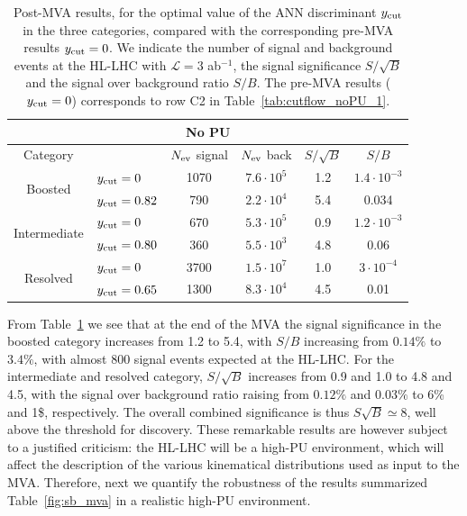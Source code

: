 \begin{table}[t]
  \centering
  \begin{tabular}{|c|l|c|c|c|c|}
    \hline
    \multicolumn{6}{|c|}{No PU} \\
    \hline
    \hline
    Category  &   &  $N_{\rm ev}$ signal &  $N_{\rm ev}$ back  &  $S/\sqrt{B}$ & $S/B$ \\ 
    \hline
    \hline
    \multirow{2}{*}{Boosted} &  $y_{\rm cut}=0$  & 1070 & $7.6\cdot 10^5$  & 1.2  & $1.4\cdot 10^{-3}$  \\
    &  $y_{\rm cut}=0.82$ & 790  & $2.2\cdot 10^4$   & 5.4  & 0.034 \\
    \hline
    \hline
    \multirow{2}{*}{Intermediate} &  $y_{\rm cut}=0$  & 670   & $5.3\cdot 10^5$
    & 0.9 & $1.2\cdot 10^{-3}$ \\
    &  $y_{\rm cut}=0.80$ & 360  & $5.5\cdot 10^3$  & 4.8 & 0.06\\
    \hline
    \hline
      \multirow{2}{*}{Resolved} &  $y_{\rm cut}=0$  & 3700 &  $1.5\cdot 10^{7}$ &  1.0 &$3\cdot 10^{-4}$ \\
    &  $y_{\rm cut}=0.65$ & 1300  & $8.3\cdot 10^{4}$ & 4.5 & 0.01 \\
    \hline
      \end{tabular}
  \caption{\small Post-MVA results, for the optimal value of the
    ANN discriminant $y_{\rm cut}$ in the three categories, compared with the
    corresponding
    pre-MVA results $y_{\rm cut}=0$.
    We indicate the number of signal and
    background events
    at the HL-LHC with $\mathcal{L}=3$ ab$^{-1}$,
    the signal significance $S/\sqrt{B}$ and
    the signal over background ratio $S/B$.
    The pre-MVA results ($y_{\rm cut}=0$) corresponds to row C2 in
    Table~\ref{tab:cutflow_noPU_1}.
    \label{table:cutflowMVA}
  }
\end{table}




From Table~\ref{table:cutflowMVA} we see that at the end of the
MVA the signal significance in the boosted category increases
from 1.2 to 5.4, with $S/B$ increasing from $0.14\%$ to $3.4\%$,
with almost 800 signal events expected at the HL-LHC.
%
For the intermediate and resolved category, $S/\sqrt{B}$
increases from 0.9 and 1.0 to 4.8 and 4.5, with
the signal over background ratio raising from
$0.12\%$ and $0.03\%$ to 6\% and 1\$, respectively.
%
The overall combined significance is thus $S\sqrt{B}\simeq 8$,
well above the threshold for discovery.
%
These remarkable results are however subject to a justified
criticism:
the HL-LHC will be a high-PU environment,
which will affect the description of the various
kinematical distributions used as input to the MVA.
%
Therefore, next we quantify the robustness of the
results summarized Table~\ref{fig:sb_mva}
in a realistic high-PU environment.

